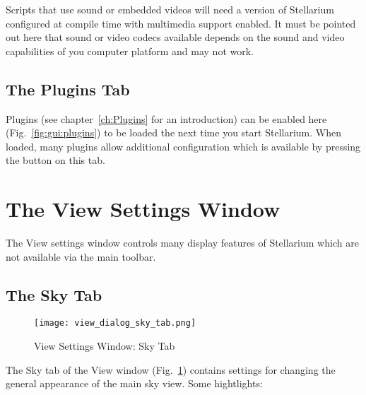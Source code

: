 Scripts that use sound or embedded videos will need a version of
Stellarium configured at compile time with multimedia support
enabled. It must be pointed out here that sound or video codecs
available depends on the sound and video capabilities of you computer
platform and may not work.


\subsection{The Plugins Tab}
\label{sec:gui:configuration:plugins}


Plugins (see chapter~\ref{ch:Plugins} for an introduction) can be
enabled here (Fig.~\ref{fig:gui:plugins}) to be loaded the next time
you start Stellarium. When loaded, many plugins allow additional configuration
which is available by pressing the  button on this tab.




\section{The View Settings Window}
\label{sec:gui:view}

The View settings window controls many display features of Stellarium
which are not available via the main toolbar.

\subsection{The Sky Tab}
\label{sec:gui:view:sky}

\begin{figure}[t]
\centering\texttt{[image: view\_dialog\_sky\_tab.png]}
\caption{View Settings Window: Sky Tab}
\label{fig:gui:view:sky}
\end{figure}

The Sky tab of the View window (Fig.~\ref{fig:gui:view:sky}) contains settings
for changing the general appearance of the main sky view. Some
hightlights:


